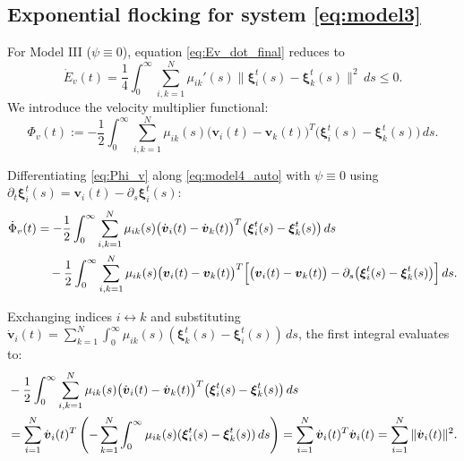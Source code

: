 \documentclass[11pt]{amsart}
\numberwithin{equation}{section}
\begin{document}
\subsection{Exponential flocking for system \eqref{eq:model3}}
For Model III ($\psi \equiv 0$), equation \eqref{eq:Ev_dot_final} reduces to
$$
\dot{E}_v(t) = \frac14\int_0^\infty\sum_{i,k=1}^N \mu_{ik}'(s)\|\boldsymbol{\xi}_i^t(s)-\boldsymbol{\xi}_k^t(s)\|^2\,ds \le 0.
$$
We introduce the velocity multiplier functional:
\begin{equation}\label{eq:Phi_v}
\Phi_v(t) := -\frac12\int_0^\infty\sum_{i,k=1}^N \mu_{ik}(s)\bigl(\boldsymbol{v}_i(t)-\boldsymbol{v}_k(t)\bigr)^T\bigl(\boldsymbol{\xi}_i^t(s)-\boldsymbol{\xi}_k^t(s)\bigr)\,ds.
\end{equation}

 Differentiating \eqref{eq:Phi_v} along \eqref{eq:model4_auto} with $\psi \equiv 0$ using $\partial_t \boldsymbol{\xi}_i^t(s) = \boldsymbol{v}_i(t) - \partial_s \boldsymbol{\xi}_i^t(s)$:
\begin{align}\label{eq:Phiv_dot_split}
\dot{\Phi}_v(t) &= -\frac12\int_0^\infty\sum_{i,k=1}^N\mu_{ik}(s)\bigl(\dot{\boldsymbol{v}}_i(t)-\dot{\boldsymbol{v}}_k(t)\bigr)^T\bigl(\boldsymbol{\xi}_i^t(s)-\boldsymbol{\xi}_k^t(s)\bigr)\,ds \notag \\
&\quad -\frac12\int_0^\infty\sum_{i,k=1}^N\mu_{ik}(s)\bigl(\boldsymbol{v}_i(t)-\boldsymbol{v}_k(t)\bigr)^T\Bigl[\bigl(\boldsymbol{v}_i(t)-\boldsymbol{v}_k(t)\bigr)-\partial_s\bigl(\boldsymbol{\xi}_i^t(s)-\boldsymbol{\xi}_k^t(s)\bigr)\Bigr]\,ds.
\end{align}

Exchanging indices $i \leftrightarrow k$ and substituting $\dot{\boldsymbol{v}}_i(t) = \sum\limits_{k=1}^N \int_0^\infty \mu_{ik}(s)(\boldsymbol{\xi}_k^t(s)-\boldsymbol{\xi}_i^t(s))\,ds$, the first integral evaluates to:
{\small
\begin{align}\label{eq:Phiv_term1}
&-\frac12\int_0^\infty \sum_{i,k=1}^N \mu_{ik}(s) \big(\dot{\boldsymbol{v}}_i(t)-\dot{\boldsymbol{v}}_k(t)\big)^T \big(\boldsymbol{\xi}_i^t(s)-\boldsymbol{\xi}_k^t(s)\big)\,ds \notag \\
&= \sum_{i=1}^N \dot{\boldsymbol{v}}_i(t)^T \left( -\sum_{k=1}^N \int_0^\infty \mu_{ik}(s)(\boldsymbol{\xi}_i^t(s)-\boldsymbol{\xi}_k^t(s))\,ds \right) = \sum_{i=1}^N \dot{\boldsymbol{v}}_i(t)^T \dot{\boldsymbol{v}}_i(t) = \sum_{i=1}^N \|\dot{\boldsymbol{v}}_i(t)\|^2.
\end{align}
}
\end{document}
